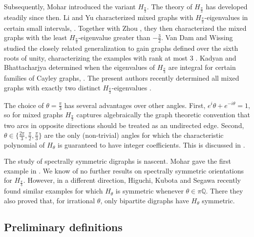 \documentclass[11pt]{article}
\theoremstyle{plain}
\newcommand{\ssym}[0]{spectrally symmetric }
\newcommand{\Hs}[0]{H_{\frac{\pi}{3}}}
\begin{document}
Subsequently, Mohar \cite{M20} introduced the variant $\Hs$. The theory of $\Hs$ has developed steadily since then. Li and Yu characterized mixed graphs with  $\Hs$-eigenvalues in certain small intervals, \cite{LY21}. Together with Zhou \cite{ZLY23}, they then characterized the mixed graphs with the least $\Hs$-eigenvalue greater than $-\frac{3}{2}$. Van Dam and Wissing studied the closely related generalization to gain graphs defined over the sixth roots of unity, characterizing the examples with rank at most 3 \cite{vDW22b}. Kadyan and Bhattacharjya determined when the eigenvalues of $\Hs$ are integral for certain families of Cayley graphs, \cite{K23,KB22}. The present authors recently determined all mixed graphs with exactly two distinct $\Hs$-eigenvalues \cite{AALMX25}.

The choice of $\theta=\frac{\pi}{3}$ has several advantages over other angles. First, $e^i\theta+e^{-i\theta}=1$, so for mixed graphs $\Hs$ captures algebraically the graph theoretic convention that two arcs in opposite directions should be treated as an undirected edge. Second, $\theta\in \{\frac{2\pi}{3},\frac{\pi}{2},\frac{\pi}{3}\}$ are the only (non-trivial) angles for which the characteristic polynomial of $H_\theta$ is guaranteed to have integer coefficients. This is discussed in \cite{AALMX25}.

The study of \ssym digraphs is nascent. Mohar gave the first example in \cite{M20}. We know of no further results on \ssym orientations for $\Hs$. However, in a different direction, Higuchi, Kubota and Segawa \cite{HKS24} recently found similar examples for which $H_\theta$ is symmetric whenever $\theta\in \pi\mathbb{Q}$. There they also proved that, for irrational $\theta$, only bipartite digraphs have $H_\theta$ symmetric.


\subsection{Preliminary definitions}
\end{document}
